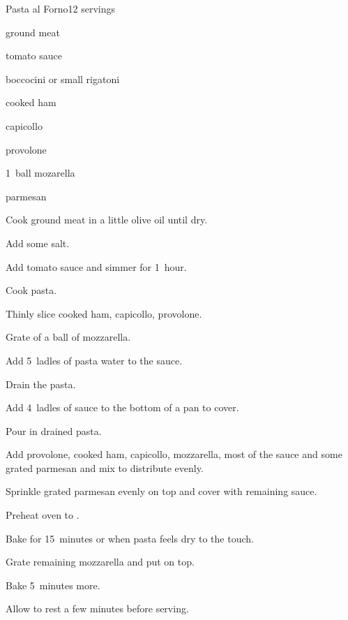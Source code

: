 \begin{recipe}{Pasta al Forno}{}{12 servings}

\begin{ingredients}
\item \lbs{1\half} ground meat
\item {} tomato sauce
\item {} boccocini or small rigatoni
\item {} cooked ham
\item {} capicollo
\item {} provolone
\item 1~ball mozarella
\item parmesan
\end{ingredients}

\begin{directions}
\item Cook ground meat in a little olive oil until dry.
\item Add some salt.
\item Add tomato sauce and simmer for 1~hour.
\item Cook pasta.
\item Thinly slice cooked ham, capicollo, provolone.
\item Grate \threequarter{} of a ball of mozzarella.
\item Add 5~ladles of pasta water to the sauce.
\item Drain the pasta.
\item Add 4~ladles of sauce to the bottom of a pan to cover.
\item Pour in drained pasta.
\item Add provolone, cooked ham, capicollo, mozzarella, most of the sauce and some grated parmesan and mix to distribute evenly.
\item Sprinkle grated parmesan evenly on top and cover with remaining sauce.
\item Preheat oven to .
\item Bake for 15~minutes or when pasta feels dry to the touch.
\item Grate remaining mozzarella and put on top.
\item Bake 5~minutes more.
\item Allow to rest a few minutes before serving.
\end{directions}

\end{recipe}
